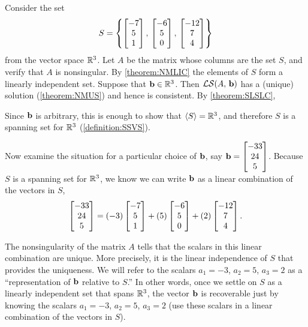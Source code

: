 \documentclass{ximera}
\begin{document}
\begin{example}
  Consider the set
  \[
    S=\left\{\begin{bmatrix}-7\\5\\1\end{bmatrix},\,\begin{bmatrix}-6\\5\\0\end{bmatrix},\,\begin{bmatrix}-12\\7\\4\end{bmatrix}\right\}
  \]
  from the vector space $\mathbb{R}^{3}$.  Let $A$ be the matrix whose
  columns are the set $S$, and verify that $A$ is nonsingular.  By
  \ref{theorem:NMLIC} the elements of $S$ form a linearly independent
  set.  Suppose that $\mathbf{b}\in\mathbb{R}^{3}$.  Then
  $\mathcal{LS}\!\left(A,\,\mathbf{b}\right)$ has a (unique) solution
  (\ref{theorem:NMUS}) and hence is consistent.  By
  \ref{theorem:SLSLC}, 
  \begin{multipleChoice}
  \end{multipleChoice}
  Since $\mathbf{b}$ is arbitrary, this is enough to show that
  $\left\langle S\right\rangle=\mathbb{R}^{3}$, and therefore $S$ is a spanning set for
  $\mathbb{R}^{3}$ (\ref{definition:SSVS}).

  Now examine the situation for a particular choice of $\mathbf{b}$, say
  $\mathbf{b}=\begin{bmatrix}-33\\24\\5\end{bmatrix}$.  Because $S$ is a spanning set
  for $\mathbb{R}^{3}$, we know we can write $\mathbf{b}$ as a linear
  combination of the vectors in $S$,
  \[
    \begin{bmatrix}-33\\24\\5\end{bmatrix}=
    (-3)\begin{bmatrix}-7\\5\\1\end{bmatrix}+(5)\begin{bmatrix}-6\\5\\0\end{bmatrix}+(2)\begin{bmatrix}-12\\7\\4\end{bmatrix}.
  \]

  The nonsingularity of the matrix $A$ tells that the scalars in this
  linear combination are unique.  More precisely, it is the linear
  independence of $S$ that provides the uniqueness.  We will refer to
  the scalars $a_1=-3$, $a_2=5$, $a_3=2$ as a ``representation of
  $\mathbf{b}$ relative to $S$.''  In other words, once we settle on $S$
  as a linearly independent set that spans $\mathbb{R}^{3}$, the vector
  $\mathbf{b}$ is recoverable just by knowing the scalars $a_1=-3$,
  $a_2=5$, $a_3=2$ (use these scalars in a linear combination of the
  vectors in $S$).
\end{example}
\end{document}
